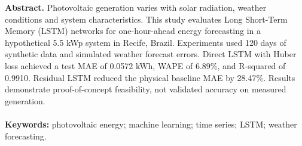 \noindent\textbf{Abstract.} Photovoltaic generation varies with solar radiation, weather conditions and system characteristics. This study evaluates Long Short-Term Memory (LSTM) networks for one-hour-ahead energy forecasting in a hypothetical 5.5 kWp system in Recife, Brazil. Experiments used 120 days of synthetic data and simulated weather forecast errors. Direct LSTM with Huber loss achieved a test MAE of 0.0572 kWh, WAPE of 6.89\%, and R-squared of 0.9910. Residual LSTM reduced the physical baseline MAE by 28.47\%. Results demonstrate proof-of-concept feasibility, not validated accuracy on measured generation.
\\\\
\noindent\textbf{Keywords:} photovoltaic energy; machine learning; time series; LSTM; weather forecasting.\\